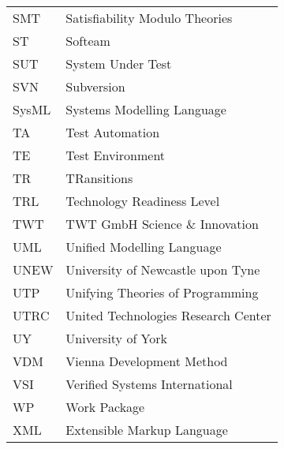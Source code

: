 \begin{longtable}{ll}
SMT & Satisfiability Modulo Theories \\
ST      &Softeam\\
SUT     &System Under Test\\
SVN	&Subversion\\
SysML	&Systems Modelling Language\\
TA      &Test Automation\\
TE & Test Environment\\
TR & TRansitions \\
TRL     &Technology Readiness Level\\
TWT & TWT GmbH Science \& Innovation\\
UML	&Unified Modelling Language\\
UNEW	&University of Newcastle upon Tyne\\
UTP     &Unifying Theories of Programming\\
UTRC    & United Technologies Research Center\\
UY      & University of York\\
VDM     &Vienna Development Method\\
VSI     & Verified Systems International\\
WP	&Work Package\\
XML	&Extensible Markup Language\\
\end{longtable}
